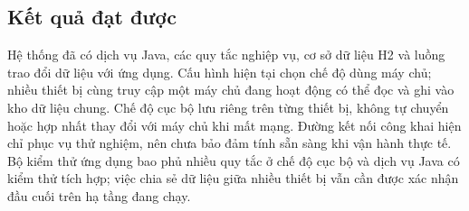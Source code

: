 \documentclass[../DoAn.tex]{subfiles}
\begin{document}
\subsection{Kết quả đạt được}
Hệ thống đã có dịch vụ Java, các quy tắc nghiệp vụ, cơ sở dữ liệu H2 và luồng trao đổi dữ liệu với ứng dụng. Cấu hình hiện tại chọn chế độ dùng máy chủ; nhiều thiết bị cùng truy cập một máy chủ đang hoạt động có thể đọc và ghi vào kho dữ liệu chung. Chế độ cục bộ lưu riêng trên từng thiết bị, không tự chuyển hoặc hợp nhất thay đổi với máy chủ khi mất mạng. Đường kết nối công khai hiện chỉ phục vụ thử nghiệm, nên chưa bảo đảm tính sẵn sàng khi vận hành thực tế. Bộ kiểm thử ứng dụng bao phủ nhiều quy tắc ở chế độ cục bộ và dịch vụ Java có kiểm thử tích hợp; việc chia sẻ dữ liệu giữa nhiều thiết bị vẫn cần được xác nhận đầu cuối trên hạ tầng đang chạy.
\end{document}
